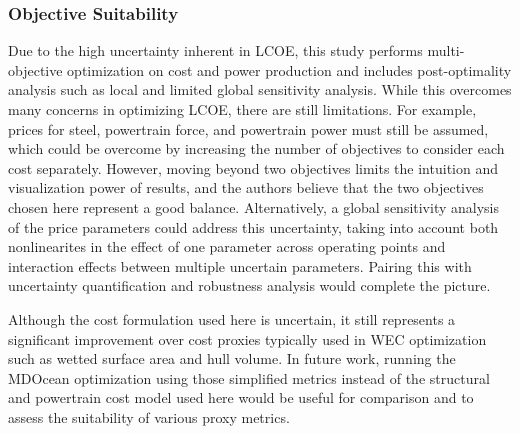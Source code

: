 \subsubsection{Objective Suitability}
Due to the high uncertainty inherent in LCOE, this study performs multi-objective optimization on cost and power production and includes post-optimality analysis such as local and limited global sensitivity analysis.
While this overcomes many concerns in optimizing LCOE, there are still limitations.
For example, prices for steel, powertrain force, and powertrain power must still be assumed, which could be overcome by increasing the number of objectives to consider each cost separately.
However, moving beyond two objectives limits the intuition and visualization power of results, and the authors believe that the two objectives chosen here represent a good balance.
Alternatively, a global sensitivity analysis of the price parameters could address this uncertainty, taking into account both nonlinearites in the effect of one parameter across operating points and interaction effects between multiple uncertain parameters.
Pairing this with uncertainty quantification and robustness analysis would complete the picture.

Although the cost formulation used here is uncertain, it still represents a significant improvement over cost proxies typically used in WEC optimization such as wetted surface area and hull volume.
In future work, running the MDOcean optimization using those simplified metrics instead of the structural and powertrain cost model used here would be useful for comparison and to assess the suitability of various proxy metrics. 




